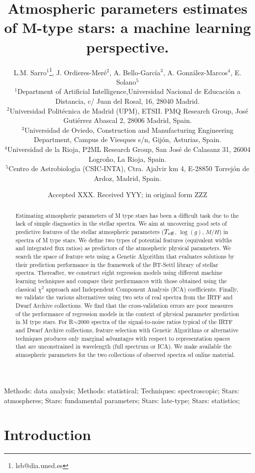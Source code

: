 \documentclass[a4paper,fleqn,usenatbib]{mnras}
\title[Atmospheric parameters estimates of M-type stars]{Atmospheric parameters estimates of M-type stars: a machine learning perspective.}
\author[L. M. Sarro et al.]
          {
L.M. Sarro$^{1}$\thanks{lsb@dia.uned.es},
J. Ordieres-Mer\'e$^{2}$,       
A. Bello-Garc\'ia$^{3}$, 
A. Gonz\'alez-Marcos$^{4}$, 
E. Solano$^{5}$
\\
$^{1}$Department of Artificial Intelligence,Universidad Nacional de Educaci\'{o}n a Distancia, c/ Juan del Rosal, 16, 28040 Madrid.\\
$^{2}$Universidad Polit\'{e}cnica de Madrid (UPM), ETSII. PMQ Research Group, Jos\'{e} Guti\'{e}rrez Abascal 2, 28006 Madrid, Spain. \\
$^{3}$Universidad de Oviedo, Construction and Manufacturing Engineering Department, Campus de Viesques s/n, Gij\'{o}n, Asturias, Spain. \\
$^{4}$Universidad de la Rioja, P2ML Research Group, San Jos\'{e} de Calasanz 31, 26004 Logro\~{n}o, La Rioja, Spain. \\
$^{5}$Centro de Astrobiolog\'{\i}a (CSIC-INTA), Ctra. Ajalvir km 4, E-28850 Torrejón de Ardoz, Madrid, Spain.\\
}
\date{Accepted XXX. Received YYY; in original form ZZZ}
\begin{document}
 
\label{firstpage}
\pagerange{\pageref{firstpage}--\pageref{lastpage}}
\maketitle

\begin{abstract}
    Estimating atmospheric parameters of M type stars has been a
    difficult task due to the lack of simple diagnostics in the
    stellar spectra.  We aim at uncovering good sets of predictive
    features of the stellar atmospheric parameters ($T_{\rm eff}$,
    $\log(g)$, $M/H$) in spectra of M type stars. We define two types
    of potential features (equivalent widths and integrated flux
    ratios) as predictors of the atmospheric physical parameters. We
    search the space of feature sets using a Genetic Algorithm that
    evaluates solutions by their prediction performance in the
    framework of the BT-Settl library of stellar spectra. Thereafter,
    we construct eight regression models using different machine
    learning techniques and compare their performances with those
    obtained using the classical $\chi^2$ approach and Independent
    Component Analysis (ICA) coefficients. Finally, we validate the
    various alternatives using two sets of real spectra from the IRTF
    and Dwarf Archive collections.  We find that the cross-validation
    errors are poor measures of the performance of regression models
    in the context of physical parameter prediction in M type
    stars. For R$\sim$2000 spectra of the signal-to-noise ratios
    typical of the IRTF and Dwarf Archive collections, feature
    selection with Genetic Algorithms or alternative techniques
    produces only marginal advantages with respect to representation
    spaces that are unconstrained in wavelength (full spectrum or
    ICA). We make available the atmospheric parameters for the two
    collections of observed spectra sd online material.
\end{abstract}

\begin{keywords}
Methods: data analysis; Methods: statistical;
     Techniques: spectroscopic; Stars: atmospheres; Stars: fundamental
     parameters; Stars: late-type; Stars: statistics;
\end{keywords}

%

\section{Introduction}
\label{sec:intro}

\end{document}
